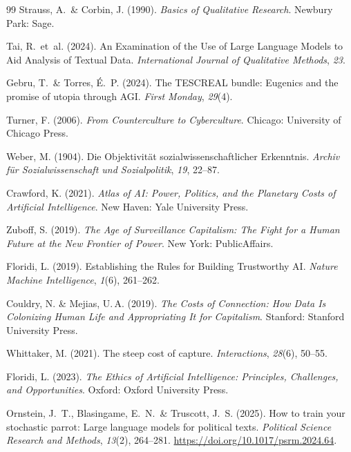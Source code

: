 \documentclass[12pt,a4paper]{article}
\begin{document}
\begin{thebibliography}{99}
  Strauss, A.~\& Corbin, J. (1990).
  \textit{Basics of Qualitative Research}.
  Newbury Park: Sage.

  Tai, R.~et~al. (2024).
  An Examination of the Use of Large Language Models to Aid Analysis of Textual Data.
  \textit{International Journal of Qualitative Methods}, \textit{23}.

  Gebru, T.~\& Torres, \'E.~P. (2024).
  The TESCREAL bundle: Eugenics and the promise of utopia through AGI.
  \textit{First Monday}, \textit{29}(4).

  Turner, F. (2006).
  \textit{From Counterculture to Cyberculture}.
  Chicago: University of Chicago Press.

  Weber, M. (1904).
  Die \glqq Objektivit\"at\grqq{} sozialwissenschaftlicher Erkenntnis.
  \textit{Archiv f\"ur Sozialwissenschaft und Sozialpolitik}, \textit{19}, 22--87.

  Crawford, K. (2021).
  \textit{Atlas of AI: Power, Politics, and the Planetary Costs of Artificial Intelligence}.
  New Haven: Yale University Press.

  Zuboff, S. (2019).
  \textit{The Age of Surveillance Capitalism: The Fight for a Human Future at the New Frontier of Power}.
  New York: PublicAffairs.

  Floridi, L. (2019).
  Establishing the Rules for Building Trustworthy AI.
  \textit{Nature Machine Intelligence}, \textit{1}(6), 261--262.

  Couldry, N. \& Mejias, U.\,A. (2019).
  \textit{The Costs of Connection: How Data Is Colonizing Human Life and Appropriating It for Capitalism}.
  Stanford: Stanford University Press.

  Whittaker, M. (2021).
  The steep cost of capture.
  \textit{Interactions}, \textit{28}(6), 50--55.

  Floridi, L. (2023).
  \textit{The Ethics of Artificial Intelligence: Principles, Challenges, and Opportunities}.
  Oxford: Oxford University Press.

  Ornstein, J.~T., Blasingame, E.~N.~\& Truscott, J.~S. (2025).
  How to train your stochastic parrot: Large language models for political texts.
  \textit{Political Science Research and Methods}, \textit{13}(2), 264--281.
  \url{https://doi.org/10.1017/psrm.2024.64}.


\end{thebibliography}
\end{document}

